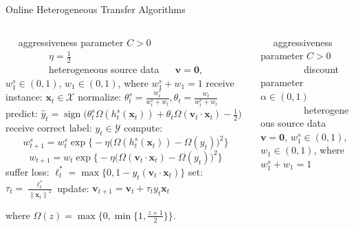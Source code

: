 \documentclass{beamer}
\DeclareMathOperator{\sign}{sign}
\begin{document}
\begin{frame}{Online Heterogeneous Transfer Algorithms}
\begin{columns}
\begin{column}{0.5\textwidth}
\begin{algorithm}[H]
\begin{algorithmic}[1]
\caption{Online Heterogeneous Transfer Algorithm 1 (OHT1)}
\scriptsize
\REQUIRE ~~
aggressiveness parameter $C>0$\\ 
~~~~~~~~~$\eta = \frac{1}{2}$ \\
~~~~~~~~~heterogeneous source data
\ENSURE ~~
$\mathbf{v} = \mathbf{0}$, $w_{1}^{s} \in (0,1)$, $w_{1} \in (0,1)$, where $w_{1}^{s} + w_1 = 1$
\STATE 
  receive instance: $\mathbf{x}_t \in \mathcal{X}$
\STATE
  normalize: $\theta_{t}^{s} = \frac{w_{t}^{s}}{w_{t}^{s}+w_t}, \theta_{t} = \frac{w_{t}}{w_{t}^{s}+w_t}$
\STATE
  predict: $\hat{y}_t = \sign \big( \theta_{t}^{s} \varOmega (h_{t}^{s}(\mathbf{x}_t)) + \theta_{t} \varOmega (\mathbf{v}_t \cdot \mathbf{x}_t) - \frac{1}{2} \big)$
\STATE
  receive correct label: $y_t \in \mathcal{Y}$
\STATE
  compute: 
    $$w_{t+1}^{s} = w_{t}^{s} \exp \big\{ -\eta \big(\varOmega(h_{t}^{s}(\mathbf{x}_t)) - \varOmega(y_t)\big)^2 \big\} $$
    $$w_{t+1} = w_{t} \exp \big\{ -\eta \big(\varOmega(\mathbf{v}_t \cdot \mathbf{x}_t) - \varOmega(y_t)\big)^2 \big\} $$
\STATE
  suffer loss: $\ell_{t}^{*} = \max \{0, 1-y_t(\mathbf{v}_t \cdot \mathbf{x}_t)\}$
\STATE
  set: $\tau_t = \frac{\ell_{t}^{*}}{{\|\mathbf{x}_t\|}^2}$
\STATE
  update: $ \mathbf{v}_{t+1} = \mathbf{v}_t + \tau_t y_t \mathbf{x}_t $
\ENDFOR
\end{algorithmic}
\end{algorithm}
where $\varOmega(z) = \max \{ 0, \min \{ 1, \frac{z+1}{2} \}\}$.
\end{column}
\begin{column}{0.5\textwidth}
\begin{algorithm}[H]
\begin{algorithmic}[1]
\caption{Online Heterogeneous Transfer Algorithm 2 (OHT2)}
\scriptsize
\REQUIRE ~~
aggressiveness parameter $C>0$\\ 
~~~~~~~~~discount parameter $\alpha \in (0,1)$\\ 
~~~~~~~~~heterogeneous source data 
\ENSURE ~~
$\mathbf{v} = \mathbf{0}$, $w_{1}^{s} \in (0,1)$, $w_{1} \in (0,1)$, where $w_{1}^{s} + w_1 = 1$

\end{algorithmic}
\end{algorithm}
\end{column}
\end{columns}
\end{frame}
\end{document}

